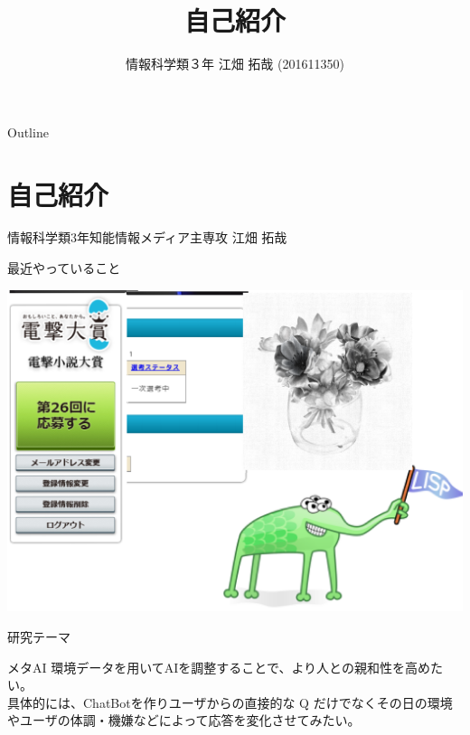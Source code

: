 \documentclass[dvipdfmx,10pt,presentation]{beamer}
\author{情報科学類３年 江畑 拓哉 (201611350)}
\date{}
\title{自己紹介}
\begin{document}
\maketitle
\begin{frame}{Outline}
\tableofcontents
\end{frame}

\section{自己紹介}
\label{sec:orgafc7193}
\begin{frame}[label={sec:org57a6e18}]{}
情報科学類3年知能情報メディア主専攻 江畑 拓哉\\
\begin{block}{最近やっていること}
\begin{center}
\includegraphics[width=0.7\linewidth]{./res.png}
\end{center}
\end{block}
\end{frame}
\begin{frame}[label={sec:org1f0b6dd}]{研究テーマ}
\begin{block}{メタAI}
環境データを用いてAIを調整することで、より人との親和性を高めたい。\\
具体的には、ChatBotを作りユーザからの直接的な Q だけでなくその日の環境やユーザの体調・機嫌などによって応答を変化させてみたい。\\
\end{block}
\end{frame}
\end{document}
